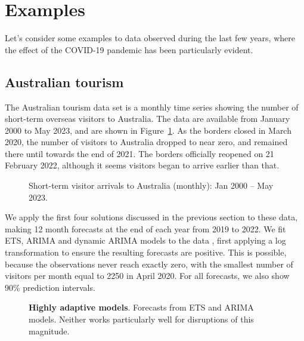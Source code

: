 \documentclass[11pt,a4paper,]{article}
\begin{document}
\section{Examples}\label{sec-examples}

Let's consider some examples to data observed during the last few years,
where the effect of the COVID-19 pandemic has been particularly evident.

\subsection{Australian tourism}\label{sec-tourism}

The Australian tourism data set is a monthly time series showing the
number of short-term overseas visitors to Australia. The data
\autocite{tourismdata} are available from January 2000 to May 2023, and
are shown in Figure~\ref{fig-tourism-plot1}. As the borders closed in
March 2020, the number of visitors to Australia dropped to near zero,
and remained there until towards the end of 2021. The borders officially
reopened on 21 February 2022, although it seems visitors began to arrive
earlier than that.

\begin{figure}


\caption{\label{fig-tourism-plot1}Short-term visitor arrivals to
Australia (monthly): Jan 2000 -- May 2023.}

\end{figure}%

We apply the first four solutions discussed in the previous section to
these data, making 12 month forecasts at the end of each year from 2019
to 2022. We fit ETS, ARIMA and dynamic ARIMA models to the data
\autocite{fpp3}, first applying a log transformation to ensure the
resulting forecasts are positive. This is possible, because the
observations never reach exactly zero, with the smallest number of
visitors per month equal to 2250 in April 2020. For all forecasts, we
also show 90\% prediction intervals.

\begin{figure}[!b]


\caption{\label{fig-tsol1-plot}\textbf{Highly adaptive models}.
Forecasts from ETS and ARIMA models. Neither works particularly well for
disruptions of this magnitude.}

\end{figure}%
\end{document}
